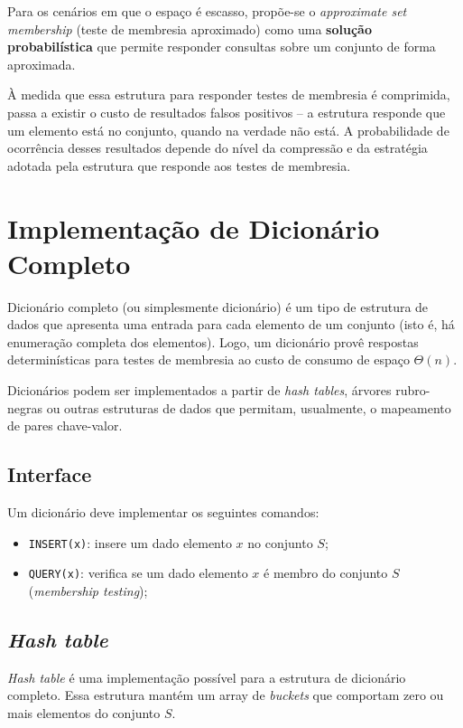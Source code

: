 \documentclass[12pt,twoside,english,brazilian]{book}
\begin{document}
Para os cenários em que o espaço é escasso, propõe-se o \textit{approximate set membership} (teste de membresia aproximado) como uma \textbf{solução probabilística} que permite responder consultas sobre um conjunto de forma aproximada.

À medida que essa estrutura para responder testes de membresia é comprimida, passa a existir o custo de resultados falsos positivos -- a estrutura responde que um elemento está no conjunto, quando na verdade não está. A probabilidade de ocorrência desses resultados depende do nível da compressão e da estratégia adotada pela estrutura que responde aos testes de membresia.

\section{Implementação de Dicionário Completo}

Dicionário completo (ou simplesmente dicionário) é um tipo de estrutura de dados que apresenta uma entrada para cada elemento de um conjunto (isto é, há enumeração completa dos elementos). Logo, um dicionário provê respostas determinísticas para testes de membresia ao custo de consumo de espaço $\Theta(n)$.

Dicionários podem ser implementados a partir de \textit{hash tables}, árvores rubro-negras ou outras estruturas de dados que permitam, usualmente, o mapeamento de pares chave-valor.

\subsection{Interface}

Um dicionário deve implementar os seguintes comandos:
\begin{itemize}
    \item \texttt{INSERT(x)}: insere um dado elemento $x$ no conjunto $S$;
    \item \texttt{QUERY(x)}: verifica se um dado elemento $x$ é membro do conjunto $S$ (\textit{membership testing});
\end{itemize}

\subsection{\textit{Hash table}}

\textit{Hash table} é uma implementação possível para a estrutura de dicionário completo. Essa estrutura mantém um array de \textit{buckets} que comportam zero ou mais elementos do conjunto $S$. 
\end{document}
